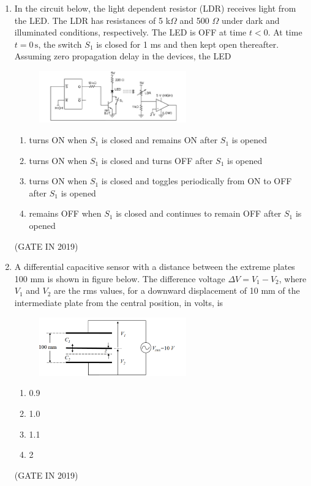 \documentclass[journal]{IEEEtran}
\begin{document}
\begin{enumerate}
\item In the circuit below, the light dependent resistor (LDR) receives light from the LED. The LDR has resistances of 5 k$\Omega$ and 500 $\Omega$ under dark and illuminated conditions, respectively. The LED is OFF at time $t < 0$. At time $t = 0 \, \text{s}$, the switch $S_1$ is closed for 1 ms and then kept open thereafter. Assuming zero propagation delay in the devices, the LED
\begin{figure}[H]
    \centering
    \includegraphics[width=0.6\textwidth]{14.png}
    \caption{}
    \label{fig:fig14}
\end{figure}
\begin{enumerate}
\item turns ON when $S_1$ is closed and remains ON after $S_1$ is opened
\item turns ON when $S_1$ is closed and turns OFF after $S_1$ is opened
\item turns ON when $S_1$ is closed and toggles periodically from ON to OFF after $S_1$ is opened
\item remains OFF when $S_1$ is closed and continues to remain OFF after $S_1$ is opened
\end{enumerate}
\hfill(GATE IN 2019)

\item A differential capacitive sensor with a distance between the extreme plates 100 mm is shown in figure below. The difference voltage $\Delta V = V_1 - V_2$, where $V_1$ and $V_2$ are the rms values, for a downward displacement of 10 mm of the intermediate plate from the central position, in volts, is
\begin{figure}[H]
    \centering
    \includegraphics[width=0.6\textwidth]{15.png}
    \caption{}
    \label{fig:fig15}
\end{figure}
\begin{multicols}{4}
\begin{enumerate}
\item 0.9
\item 1.0
\item 1.1
\item 2
\end{enumerate}
\end{multicols} \hfill(GATE IN 2019)


\end{enumerate}
\end{document}
